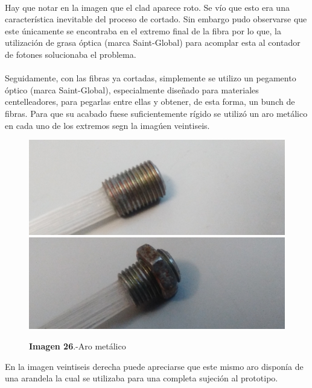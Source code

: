 \paragraph {}
Hay que notar en la imagen que el clad aparece roto. Se vío que esto era una característica inevitable del proceso de cortado. Sin embargo pudo observarse que este únicamente se encontraba en el extremo final de la fibra por lo que, la utilización de grasa óptica (marca Saint-Global) para acomplar esta al contador de fotones solucionaba el problema.

\paragraph {}
Seguidamente, con las fibras ya cortadas, simplemente se utilizo un pegamento óptico (marca Saint-Global), especialmente diseñado para materiales centelleadores, para pegarlas entre ellas y obtener, de esta forma, un bunch de fibras. Para que su acabado fuese suficientemente rígido se utilizó un aro metálico en cada uno de los extremos segn la imagúen veintiseis.

\begin{figure}[htb]
\centering
{
\includegraphics[scale=0.2]{arometalico.png} 
}
{
\includegraphics[scale=0.2]{arometalicoconrosca.png} 
}
\caption{\textbf{Imagen 26}.-Aro metálico}
\end{figure} 

En la imagen veintiseis derecha puede apreciarse que este mismo aro disponía de una arandela la cual se utilizaba para una completa sujeción al prototipo.



